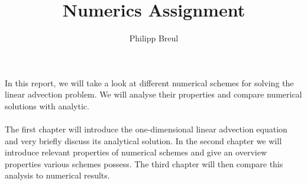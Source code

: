 \documentclass[11pt,a4paper,onecolumn]{article}
\author{Philipp Breul}
\title{Numerics Assignment}
\numberwithin{equation}{section} %
\begin{document}
\maketitle
In this report, we will take a look at different numerical schemes for solving the linear advection problem. We will analyse their properties and compare numerical solutions with analytic. \\ \\
The first chapter will introduce the one-dimensional linear advection equation and very briefly discuss its analytical solution. In the second chapter we will introduce relevant properties of numerical schemes and give an overview properties various schemes possess. The third chapter will then compare this analysis to numerical results. 




\FloatBarrier
{}

\end{document}
